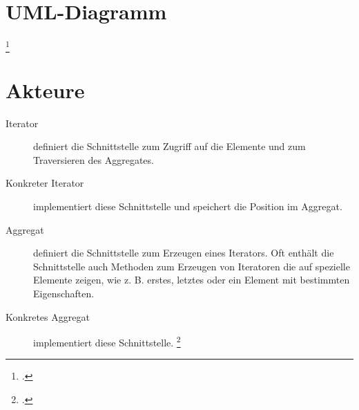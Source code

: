 \documentclass{lehramt-informatik-haupt}
\begin{document}
\section{UML-Diagramm}

\footcite{wiki:iterator}

%

\section{Akteure}

\begin{description}
\item[Iterator] definiert die Schnittstelle zum Zugriff auf die Elemente
und zum Traversieren des Aggregates.

\item[Konkreter Iterator] implementiert diese Schnittstelle und
speichert die Position im Aggregat.

\item[Aggregat] definiert die Schnittstelle zum Erzeugen eines
Iterators. Oft enthält die Schnittstelle auch Methoden zum Erzeugen von
Iteratoren die auf spezielle Elemente zeigen, wie z. B. erstes, letztes
oder ein Element mit bestimmten Eigenschaften.

\item[Konkretes Aggregat] implementiert diese Schnittstelle.
\footcite{wiki:iterator}
\end{description}

\literatur
\end{document}
